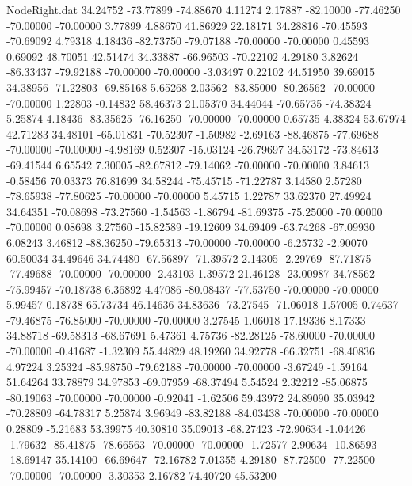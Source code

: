 \begin{filecontents}{NodeRight.dat}
  34.24752  -73.77899  -74.88670     4.11274    2.17887  -82.10000  -77.46250  -70.00000  -70.00000    3.77899    4.88670   41.86929   22.18171
  34.28816  -70.45593  -70.69092     4.79318    4.18436  -82.73750  -79.07188  -70.00000  -70.00000    0.45593    0.69092   48.70051   42.51474
  34.33887  -66.96503  -70.22102     4.29180    3.82624  -86.33437  -79.92188  -70.00000  -70.00000   -3.03497    0.22102   44.51950   39.69015
  34.38956  -71.22803  -69.85168     5.65268    2.03562  -83.85000  -80.26562  -70.00000  -70.00000    1.22803   -0.14832   58.46373   21.05370
  34.44044  -70.65735  -74.38324     5.25874    4.18436  -83.35625  -76.16250  -70.00000  -70.00000    0.65735    4.38324   53.67974   42.71283
  34.48101  -65.01831  -70.52307    -1.50982   -2.69163  -88.46875  -77.69688  -70.00000  -70.00000   -4.98169    0.52307  -15.03124  -26.79697
  34.53172  -73.84613  -69.41544     6.65542    7.30005  -82.67812  -79.14062  -70.00000  -70.00000    3.84613   -0.58456   70.03373   76.81699
  34.58244  -75.45715  -71.22787     3.14580    2.57280  -78.65938  -77.80625  -70.00000  -70.00000    5.45715    1.22787   33.62370   27.49924
  34.64351  -70.08698  -73.27560    -1.54563   -1.86794  -81.69375  -75.25000  -70.00000  -70.00000    0.08698    3.27560  -15.82589  -19.12609
  34.69409  -63.74268  -67.09930     6.08243    3.46812  -88.36250  -79.65313  -70.00000  -70.00000   -6.25732   -2.90070   60.50034   34.49646
  34.74480  -67.56897  -71.39572     2.14305   -2.29769  -87.71875  -77.49688  -70.00000  -70.00000   -2.43103    1.39572   21.46128  -23.00987
  34.78562  -75.99457  -70.18738     6.36892    4.47086  -80.08437  -77.53750  -70.00000  -70.00000    5.99457    0.18738   65.73734   46.14636
  34.83636  -73.27545  -71.06018     1.57005    0.74637  -79.46875  -76.85000  -70.00000  -70.00000    3.27545    1.06018   17.19336    8.17333
  34.88718  -69.58313  -68.67691     5.47361    4.75736  -82.28125  -78.60000  -70.00000  -70.00000   -0.41687   -1.32309   55.44829   48.19260
  34.92778  -66.32751  -68.40836     4.97224    3.25324  -85.98750  -79.62188  -70.00000  -70.00000   -3.67249   -1.59164   51.64264   33.78879
  34.97853  -69.07959  -68.37494     5.54524    2.32212  -85.06875  -80.19063  -70.00000  -70.00000   -0.92041   -1.62506   59.43972   24.89090
  35.03942  -70.28809  -64.78317     5.25874    3.96949  -83.82188  -84.03438  -70.00000  -70.00000    0.28809   -5.21683   53.39975   40.30810
  35.09013  -68.27423  -72.90634    -1.04426   -1.79632  -85.41875  -78.66563  -70.00000  -70.00000   -1.72577    2.90634  -10.86593  -18.69147
  35.14100  -66.69647  -72.16782     7.01355    4.29180  -87.72500  -77.22500  -70.00000  -70.00000   -3.30353    2.16782   74.40720   45.53200

\end{filecontents}
